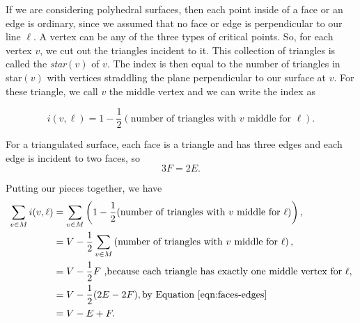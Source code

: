 If we are considering polyhedral surfaces, then each point inside of a face or an edge
is ordinary, since we assumed that no face or edge is perpendicular to our line $\ell.$
A vertex can be any of the three types of critical points.
So, for each vertex $v$, we cut out the triangles incident to it. This collection of triangles
is called the \emph{star}$(v)$ of $v$. 
The index is then equal to the number of triangles in star$(v)$ with vertices
straddling the plane perpendicular to our surface at $v$. For these triangle,
we call $v$ the middle vertex and we can write the index as

$$i(v,\ell)=1-\frac{1}{2} \left(\text{number of triangles with } v \text{ middle for } \ell\right).$$



For a triangulated surface, each face is a triangle and has three edges and each
edge is incident to two faces, so
\begin{equation} \label{eqn:faces-edges}
	3F=2E.
\end{equation}

Putting our pieces together, we have
\begin{align}
\sum_{v\in M}i(v,\ell) &=\sum_{v\in M} \left(1-\frac{1}{2}(\text{number of triangles with } v \text{ middle for } \ell)\right),  \\ \nonumber
       &=V - \frac{1}{2}\sum_{v\in M} \left(\text{number of triangles with } v \text{ middle for } \ell\right), \\ \nonumber
       &=V-\frac{1}{2} F \text{ ,because each triangle has exactly one middle vertex for  } \ell,\\ \nonumber
       &= V-\frac{1}{2}(2E-2F), \text{by \eqnref{faces-edges}}\\ \nonumber
       &=V-E+F. \nonumber 
\end{align}



